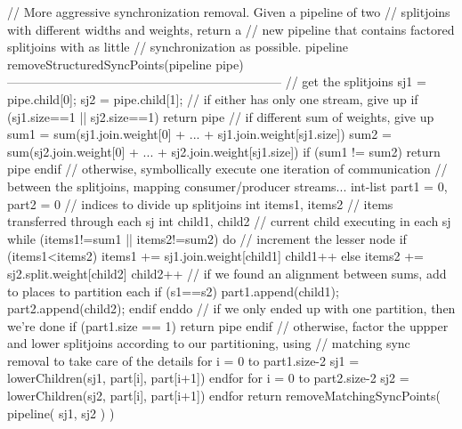 // More aggressive synchronization removal.  Given a pipeline of two
// splitjoins with different widths and weights, return a
// new pipeline that contains factored splitjoins with as little
// synchronization as possible.
pipeline removeStructuredSyncPoints(pipeline pipe)
------------------------------------------------------------------
// get the splitjoins
sj1 = pipe.child[0];
sj2 = pipe.child[1];
// if either has only one stream, give up
if (sj1.size==1 || sj2.size==1) return pipe
// if different sum of weights, give up
sum1 = sum(sj1.join.weight[0] + ... + sj1.join.weight[sj1.size])
sum2 = sum(sj2.join.weight[0] + ... + sj2.join.weight[sj1.size])
if (sum1 != sum2)
 return pipe
endif
// otherwise, symbollically execute one iteration of communication
// between the splitjoins, mapping consumer/producer streams...
int-list part1 = {0}, part2 = {0}  // indices to divide up splitjoins
int items1, items2                 // items transferred through each sj
int child1, child2                 // current child executing in each sj
while (items1!=sum1 || items2!=sum2) do
  // increment the lesser node
  if (items1<items2) {
    items1 += sj1.join.weight[child1]
    child1++
  } else {
    items2 += sj2.split.weight[child2]
    child2++
  }
  // if we found an alignment between sums, add to places to partition each
  if (s1==s2)
    part1.append(child1);
    part2.append(child2);
  endif
enddo
// if we only ended up with one partition, then we're done
if (part1.size == 1)
  return pipe
endif
// otherwise, factor the uppper and lower splitjoins according to our partitioning, using
// matching sync removal to take care of the details
for i = 0 to part1.size-2
  sj1 = lowerChildren(sj1, part[i], part[i+1])
endfor
for i = 0 to part2.size-2
  sj2 = lowerChildren(sj2, part[i], part[i+1])
endfor
return removeMatchingSyncPoints( pipeline( sj1, sj2 ) )